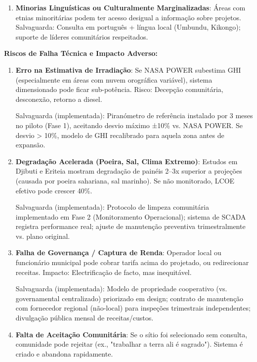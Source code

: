 \documentclass[12pt, a4paper]{article}
\begin{document}
\begin{itemize}
\begin{enumerate}
\item \textbf{Minorias Linguísticas ou Culturalmente Marginalizadas}: Áreas com etnias minoritárias podem ter acesso desigual a informação sobre projetos. Salvaguarda: Consulta em português + língua local (Umbundu, Kikongo); suporte de líderes comunitários respeitados.
\end{enumerate}

\textbf{Riscos de Falha Técnica e Impacto Adverso:}

\begin{enumerate}
\item \textbf{Erro na Estimativa de Irradiação}: Se NASA POWER subestima GHI (especialmente em áreas com nuvem orográfica variável), sistema dimensionado pode ficar sub-potência. Risco: Decepção comunitária, desconexão, retorno a diesel.
  
  Salvaguarda (implementada): Piranómetro de referência instalado por 3 meses no piloto (Fase 1), aceitando desvio máximo ±10\% vs. NASA POWER. Se desvio > 10\%, modelo de GHI recalibrado para aquela zona antes de expansão.

\item \textbf{Degradação Acelerada (Poeira, Sal, Clima Extremo)}: Estudos em Djibuti e Eriteia mostram degradação de painéis 2--3x superior a projeções (causada por poeira sahariana, sal marinho). Se não monitorado, LCOE efetivo pode crescer 40\%.
  
  Salvaguarda (implementada): Protocolo de limpeza comunitária implementado em Fase 2 (Monitoramento Operacional); sistema de SCADA registra performance real; ajuste de manutenção preventiva trimestralmente vs. plano original.

\item \textbf{Falha de Governança / Captura de Renda}: Operador local ou funcionário municipal pode cobrar tarifa acima do projetado, ou redirecionar receitas. Impacto: Electrificação de facto, mas inequitável.
  
  Salvaguarda (implementada): Modelo de propriedade cooperativo (vs. governamental centralizado) priorizado em design; contrato de manutenção com fornecedor regional (não-local) para inspeções trimestrais independentes; divulgação pública mensal de receitas/custos.

\item \textbf{Falta de Aceitação Comunitária}: Se o sítio foi selecionado sem consulta, comunidade pode rejeitar (ex., "trabalhar a terra ali é sagrado"). Sistema é criado e abandona rapidamente.
  

\end{enumerate}
\end{itemize}
\end{document}
